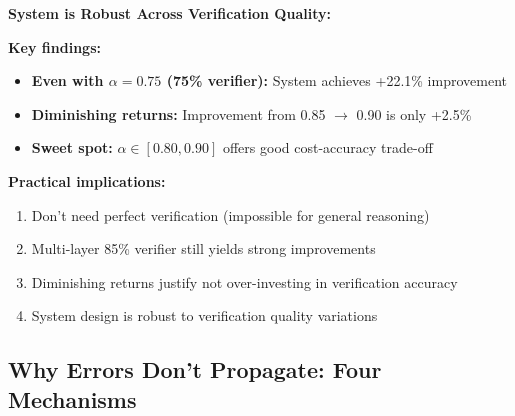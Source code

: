 \documentclass[12pt,a4paper]{article}
\theoremstyle{definition}
\begin{document}
\begin{keyinsightbox}
\textbf{System is Robust Across Verification Quality:}

\textbf{Key findings:}
\begin{itemize}
    \item \textbf{Even with $\alpha = 0.75$ (75\% verifier):} System achieves +22.1\% improvement
    \item \textbf{Diminishing returns:} Improvement from 0.85 $\rightarrow$ 0.90 is only +2.5\%
    \item \textbf{Sweet spot:} $\alpha \in [0.80, 0.90]$ offers good cost-accuracy trade-off
\end{itemize}

\textbf{Practical implications:}
\begin{enumerate}
    \item Don't need perfect verification (impossible for general reasoning)
    \item Multi-layer 85\% verifier still yields strong improvements
    \item Diminishing returns justify not over-investing in verification accuracy
    \item System design is robust to verification quality variations
\end{enumerate}
\end{keyinsightbox}

\subsection{Why Errors Don't Propagate: Four Mechanisms}
\end{document}
